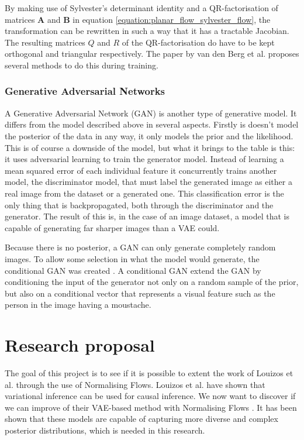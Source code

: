 \documentclass{article}
\newcommand{\bA}{\mathbf{A}}
\newcommand{\bB}{\mathbf{B}}
\begin{document}
By making use of Sylvester's determinant identity and a QR-factorisation of matrices $\bA$ and $\bB$ in equation \ref{equation:planar_flow_sylvester_flow}, the transformation can be rewritten in such a way that it has a tractable Jacobian. The resulting matrices $Q$ and $R$ of the QR-factorisation do have to be kept orthogonal and triangular respectively. The paper by van den Berg et al. proposes several methods to do this during training.

\subsubsection*{Generative Adversarial Networks}
A Generative Adversarial Network (GAN) is another type of generative model\cite{goodfellow2014generative}. It differs from the model described above in several aspects. Firstly is doesn't model the posterior of the data in any way, it only models the prior and the likelihood. This is of course a downside of the model, but what it brings to the table is this: it uses adversarial learning to train the generator model. Instead of learning a mean squared error of each individual feature it concurrently trains another model, the discriminator model, that must label the generated image as either a real image from the dataset or a generated one. This classification error is the only thing that is backpropagated, both through the discriminator and the generator. The result of this is, in the case of an image dataset, a model that is capable of generating far sharper images than a VAE could. 

Because there is no posterior, a GAN can only generate completely random images. To allow some selection in what the model would generate, the conditional GAN was created \cite{mirza2014conditional}. A conditional GAN extend the GAN by conditioning the input of the generator not only on a random sample of the prior, but also on a conditional vector that represents a visual feature such as the person in the image having a moustache.  


\section{Research proposal}
The goal of this project is to see if it is possible to extent the work of Louizos et al. \cite{louizos2017causal} through the use of Normalising Flows. Louizos et al. have shown that variational inference can be used for causal inference. We now want to discover if we can improve of their VAE-based \cite{kingma2013auto} method with Normalising Flows \cite{rezende2016variational}\cite{berg2018sylvester}\cite{dinh2016density}. It has been shown that these models are capable of capturing more diverse and complex posterior distributions, which is needed in this research.
\end{document}
